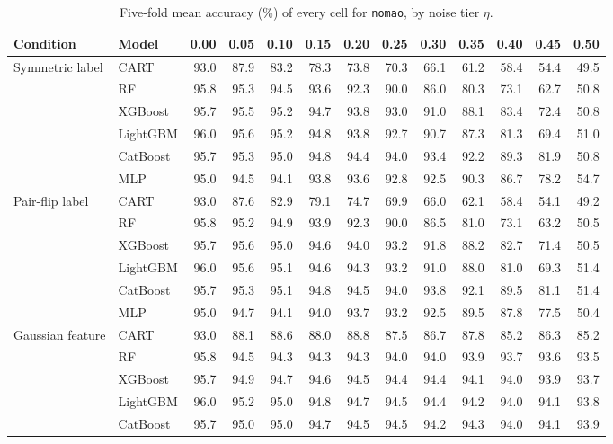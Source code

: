 \begin{table}[p]
\centering
\tiny
\setlength{\tabcolsep}{2.6pt}
\caption{Five-fold mean accuracy (\%) of every cell for \texttt{nomao}, by noise tier $\eta$.}
\label{tab:grid_nomao}
\begin{tabular}{@{}llrrrrrrrrrrr@{}}
\toprule
Condition & Model & 0.00 & 0.05 & 0.10 & 0.15 & 0.20 & 0.25 & 0.30 & 0.35 & 0.40 & 0.45 & 0.50 \\
\midrule
Symmetric label & CART & 93.0 & 87.9 & 83.2 & 78.3 & 73.8 & 70.3 & 66.1 & 61.2 & 58.4 & 54.4 & 49.5 \\
 & RF & 95.8 & 95.3 & 94.5 & 93.6 & 92.3 & 90.0 & 86.0 & 80.3 & 73.1 & 62.7 & 50.8 \\
 & XGBoost & 95.7 & 95.5 & 95.2 & 94.7 & 93.8 & 93.0 & 91.0 & 88.1 & 83.4 & 72.4 & 50.8 \\
 & LightGBM & 96.0 & 95.6 & 95.2 & 94.8 & 93.8 & 92.7 & 90.7 & 87.3 & 81.3 & 69.4 & 51.0 \\
 & CatBoost & 95.7 & 95.3 & 95.0 & 94.8 & 94.4 & 94.0 & 93.4 & 92.2 & 89.3 & 81.9 & 50.8 \\
 & MLP & 95.0 & 94.5 & 94.1 & 93.8 & 93.6 & 92.8 & 92.5 & 90.3 & 86.7 & 78.2 & 54.7 \\
\midrule
Pair-flip label & CART & 93.0 & 87.6 & 82.9 & 79.1 & 74.7 & 69.9 & 66.0 & 62.1 & 58.4 & 54.1 & 49.2 \\
 & RF & 95.8 & 95.2 & 94.9 & 93.9 & 92.3 & 90.0 & 86.5 & 81.0 & 73.1 & 63.2 & 50.5 \\
 & XGBoost & 95.7 & 95.6 & 95.0 & 94.6 & 94.0 & 93.2 & 91.8 & 88.2 & 82.7 & 71.4 & 50.5 \\
 & LightGBM & 96.0 & 95.6 & 95.1 & 94.6 & 94.3 & 93.2 & 91.0 & 88.0 & 81.0 & 69.3 & 51.4 \\
 & CatBoost & 95.7 & 95.3 & 95.1 & 94.8 & 94.5 & 94.0 & 93.8 & 92.1 & 89.5 & 81.1 & 51.4 \\
 & MLP & 95.0 & 94.7 & 94.1 & 94.0 & 93.7 & 93.2 & 92.5 & 89.5 & 87.8 & 77.5 & 50.4 \\
\midrule
Gaussian feature & CART & 93.0 & 88.1 & 88.6 & 88.0 & 88.8 & 87.5 & 86.7 & 87.8 & 85.2 & 86.3 & 85.2 \\
 & RF & 95.8 & 94.5 & 94.3 & 94.3 & 94.3 & 94.0 & 94.0 & 93.9 & 93.7 & 93.6 & 93.5 \\
 & XGBoost & 95.7 & 94.9 & 94.7 & 94.6 & 94.5 & 94.4 & 94.4 & 94.1 & 94.0 & 93.9 & 93.7 \\
 & LightGBM & 96.0 & 95.2 & 95.0 & 94.8 & 94.7 & 94.5 & 94.4 & 94.2 & 94.0 & 94.1 & 93.8 \\
 & CatBoost & 95.7 & 95.0 & 95.0 & 94.7 & 94.5 & 94.5 & 94.2 & 94.3 & 94.0 & 94.1 & 93.9 \\

\end{tabular}
\end{table}

